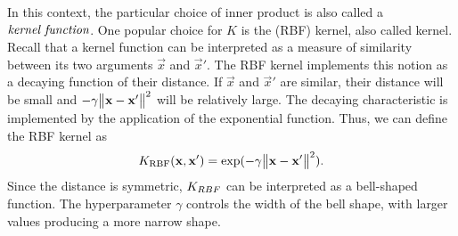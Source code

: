 \documentclass[
	fontsize=10pt, %
	twoside=false, %
	secnumdepth=1, %
  toc=indentunnumbered %
]{kaobook}
\begin{document}
In this context, the particular choice of inner product is also called a
${\textit{{kernel function}}}$.
%
%
One popular choice for $K$ is the  (RBF) kernel,
also called  kernel. Recall that a kernel function can be
interpreted as a measure of similarity between its two arguments $\vec x$ and
$\vec x'$. The RBF kernel implements this notion as a decaying function of their
distance. If $\vec x$ and $\vec x'$ are similar, their distance will be small and $-
\gamma \norm{\mathbf{x} - \mathbf{x}'}^2$ will be relatively large. The decaying
characteristic is implemented by the application of the exponential function.
Thus, we can define the RBF kernel as
\begin{align}
  K_{\text{RBF}} (\mathbf{x}, \mathbf{x}') = \exp( -\gamma \norm{\mathbf{x} - \mathbf{x}'}^2 ).
  \label{eq:rbf-kernel}
\end{align}
Since the distance is symmetric, $K_{RBF}$ can be interpreted as a bell-shaped
function.
The hyperparameter $\gamma$ controls the width of the bell shape, with
larger values producing a more narrow shape. 
\end{document}
